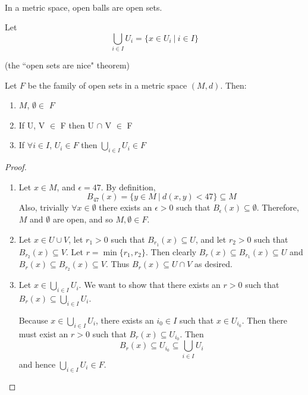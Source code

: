 \mbox{ }
\begin{smallfact}
	In a metric space, open balls are open sets. 
\end{smallfact}
\begin{definition}
	Let
	\[\bigcup_{i \in I} U_i = \{x \in U_i\ |\ i \in I\}\]
\end{definition}
\pagebreak
\begin{theorem}
	(the ``open sets are nice" theorem)
	
	Let $F$ be the family of open sets in a metric space $(M,d)$. Then: 
	\begin{enumerate}
		\item $M$, $\emptyset \in$ $F$ 
		\item If U, V $\in$ F then U $\cap$ V $\in$ F 
		\item If $\forall i \in I$, $U_i \in F$ then $\bigcup_{i \in I} U_i \in F$ 
	\end{enumerate}
\end{theorem}
\begin{proof}
	\begin{enumerate}
		\item Let $x\in M$, and $\epsilon = 47$. By definition,
		\[B_{47} (x) = \{y\in M\ |\ d(x,y)<47\} \subseteq M\]
		Also, trivially $\forall x\in \emptyset$ there exists an $\epsilon > 0$ such that $B_\epsilon (x) \subseteq \emptyset$. Therefore, $M$ and $\emptyset$ are open, and so $M, \emptyset\in F$.
		
		\item Let $x\in U\cup V$, let $r_1 >0$ such that $B_{r_1} (x) \subseteq U$, and let $r_2 >0$ such that $B_{r_2} (x) \subseteq V$. Let $r = \min\{r_1, r_2 \}$. Then clearly $B_r (x) \subseteq B_{r_1} (x) \subseteq U$ and $B_r (x) \subseteq B_{r_2} (x) \subseteq V$. Thus $B_r (x) \subseteq U \cap V$ as desired.
		
		\item Let $x \in \bigcup_{i\in I} U_i$. We want to show that there exists an $r>0$ such that $B_r (x) \subseteq \bigcup_{i\in I} U_i$. 
		
		Because $x\in \bigcup_{i\in I} U_i$, there exists an $i_0 \in I$ such that $x\in U_{i_0}$. Then there must exist an $r>0$ such that $B_r (x) \subseteq U_{i_0}$. Then
		\[B_r (x) \subseteq U_{i_0} \subseteq \bigcup_{i\in I} U_i\]
		and hence $\bigcup_{i\in I} U_i\in F$. 
	\end{enumerate}
\end{proof}

